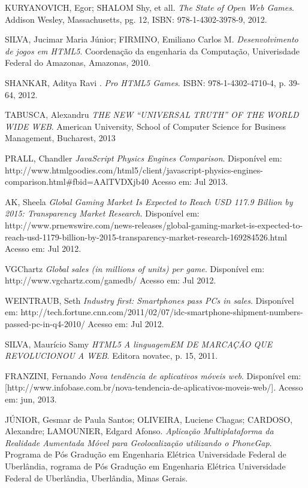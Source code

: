 \documentclass{article}
\begin{document}
\begin{thebibliography}{99}

  KURYANOVICH, Egor; SHALOM Shy, et all.
  \emph{The State of Open Web Games}.
  Addison Wesley, Massachusetts, pg. 12,
  ISBN: 978-1-4302-3978-9,
  2012.

SILVA, Jucimar Maria Júnior; FIRMINO, Emiliano Carlos M.
  \emph{Desenvolvimento de jogos em HTML5}.
  Coordenação da engenharia da Computação,
  Univerisdade Federal do Amazonas,
  Amazonas, 2010.

SHANKAR, Aditya Ravi .
  \emph{Pro HTML5 Games}.
 ISBN: 978-1-4302-4710-4, p. 39-64,
 2012.

TABUSCA, Alexandru
  \emph{THE NEW “UNIVERSAL TRUTH” OF THE WORLD WIDE WEB}.
American University, School of Computer Science for
Business Management, Bucharest, 2013

PRALL, Chandler
  \emph{JavaScript Physics Engines Comparison}.
Disponível em: http://www.htmlgoodies.com/html5/client/javascript-physics-engines-comparison.html#fbid=AAlTVDXjb40
Acesso em: Jul 2013.

AK, Sheela
  \emph{ Global Gaming Market Is Expected to Reach USD 117.9 Billion by 2015: Transparency Market Research}.
Disponível em: http://www.prnewswire.com/news-releases/global-gaming-market-is-expected-to-reach-usd-1179-billion-by-2015-transparency-market-research-169284526.html
Acesso em: Jul 2012.

VGChartz
  \emph{Global sales (in millions of units) per game}.
Disponível em: http://www.vgchartz.com/gamedb/
Acesso em: Jul 2012.


WEINTRAUB, Seth
  \emph{Industry first: Smartphones pass PCs in sales}.
Disponível em: http://tech.fortune.cnn.com/2011/02/07/idc-smartphone-shipment-numbers-passed-pc-in-q4-2010/
Acesso em: Jul 2012.

SILVA, Maurício Samy
\emph{HTML5 A linguagemEM DE MARCAÇÃO QUE REVOLUCIONOU A WEB}. 
Editora novatec, p. 15, 2011.

 FRANZINI, Fernando 
 \emph{Nova tendência de aplicativos móveis web}.  Disponível em:
[http://www.infobase.com.br/nova-tendencia-de-aplicativos-moveis-web/]. Acesso em: jun,
2013.


JÚNIOR, Gesmar de Paula Santos; OLIVEIRA, Luciene Chagas; CARDOSO, Alexandre; LAMOUNIER, Edgard Afonso.
\emph{Aplicação Multiplataforma da Realidade Aumentada Móvel para Geolocalização utilizando o PhoneGap}.
Programa de Pós Gradução em Engenharia Elétrica
Universidade Federal de Uberlândia, rograma de Pós Gradução em Engenharia Elétrica
Universidade Federal de Uberlândia, Uberlândia, Minas Gerais.


\end{thebibliography}
\end{document}
